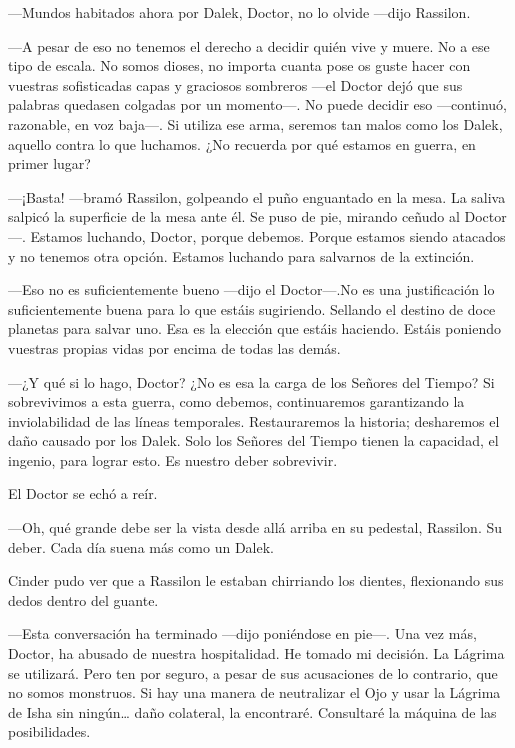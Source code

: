 —Mundos habitados ahora por Dalek, Doctor, no lo olvide —dijo Rassilon.

 

—A pesar de eso no tenemos el derecho a decidir quién vive y muere. No a ese tipo de escala. No somos dioses, no importa cuanta pose os guste hacer con vuestras sofisticadas capas y graciosos sombreros —el Doctor dejó que sus palabras quedasen colgadas por un momento—. No puede decidir eso —continuó, razonable, en voz baja—. Si utiliza ese arma, seremos tan malos como los Dalek, aquello contra lo que luchamos. ¿No recuerda por qué estamos en guerra, en primer lugar? 



—¡Basta! —bramó Rassilon, golpeando el puño enguantado en la mesa. La saliva salpicó la superficie de la mesa ante él. Se puso de pie, mirando ceñudo al Doctor—. Estamos luchando, Doctor, porque debemos. Porque estamos siendo atacados y no tenemos otra opción. Estamos luchando para salvarnos de la extinción. 

—Eso no es suficientemente bueno —dijo el Doctor—.No es una justificación lo suficientemente buena para lo que estáis sugiriendo. Sellando el destino de doce planetas para salvar uno. Esa es la elección que estáis haciendo. Estáis poniendo vuestras propias vidas por encima de todas las demás. 



—¿Y qué si lo hago, Doctor? ¿No es esa la carga de los Señores del Tiempo? Si sobrevivimos a esta guerra, como debemos, continuaremos garantizando la inviolabilidad de las líneas temporales. Restauraremos la historia; desharemos el daño causado por los Dalek. Solo los Señores del Tiempo tienen la capacidad, el ingenio, para lograr esto. Es nuestro deber sobrevivir. 



El Doctor se echó a reír. 



—Oh, qué grande debe ser la vista desde allá arriba en su pedestal, Rassilon. Su deber. Cada día suena más como un Dalek. 



Cinder pudo ver que a Rassilon le estaban chirriando los dientes, flexionando sus dedos dentro del guante. 



—Esta conversación ha terminado —dijo poniéndose en pie—. Una vez más, Doctor, ha abusado de nuestra hospitalidad. He tomado mi decisión. La Lágrima se utilizará. Pero ten por seguro, a pesar de sus acusaciones de lo contrario, que no somos monstruos. Si hay una manera de neutralizar el Ojo y usar la Lágrima de Isha sin ningún… daño colateral, la encontraré. Consultaré la máquina de las posibilidades. 



